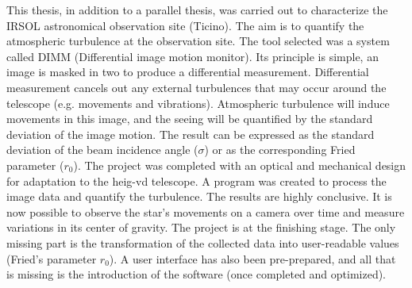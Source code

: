 This thesis, in addition to a parallel thesis, was carried out to characterize the IRSOL astronomical observation site (Ticino).
The aim is to quantify the atmospheric turbulence at the observation site.
\bigbreak
The tool selected was a system called DIMM (Differential image motion monitor).
Its principle is simple, an image is masked in two to produce a differential measurement.\newline
Differential measurement cancels out any external turbulences that may occur around the telescope (e.g. movements and vibrations).
\bigbreak
Atmospheric turbulence will induce movements in this image, and the seeing will be quantified by the standard deviation of the image motion.
The result can be expressed as the standard deviation of the beam incidence angle ($\sigma$) or as the corresponding Fried parameter ($r_0$).
\bigbreak
The project was completed with an optical and mechanical design for adaptation to the \Gls{heig-vd} telescope.
A program was created to process the image data and quantify the turbulence.
\bigbreak
The results are highly conclusive. It is now possible to observe the star's movements on a camera over time and
measure variations in its center of gravity.
The project is at the finishing stage. The only missing part is the transformation of the collected data
into user-readable values (Fried's parameter $r_0$).
\newline
A user interface has also been pre-prepared, and all that is missing is the introduction of the software (once completed and optimized).